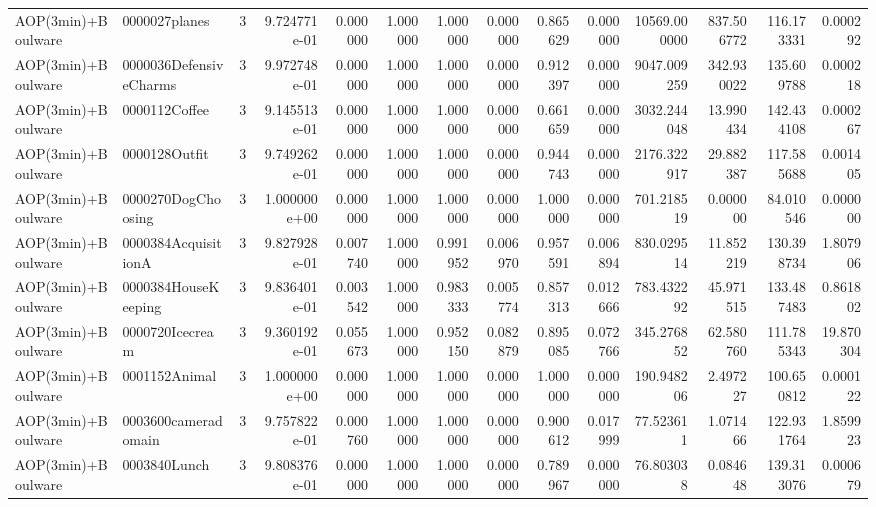 \begin{tabular}{llrr|r|rr|rr|rr|rrr}
       AOP(3min)+Boulware &          0000027planes &       3 & 9.724771e-01 & 0.000000 & 1.000000 &      1.000000 & 0.000000 &      0.865629 & 0.000000 &  10569.000000 &  837.506772 &   116.173331 &    0.000292 \\
       AOP(3min)+Boulware & 0000036DefensiveCharms &       3 & 9.972748e-01 & 0.000000 & 1.000000 &      1.000000 & 0.000000 &      0.912397 & 0.000000 &   9047.009259 &  342.930022 &   135.609788 &    0.000218 \\
       AOP(3min)+Boulware &          0000112Coffee &       3 & 9.145513e-01 & 0.000000 & 1.000000 &      1.000000 & 0.000000 &      0.661659 & 0.000000 &   3032.244048 &   13.990434 &   142.434108 &    0.000267 \\
       AOP(3min)+Boulware &          0000128Outfit &       3 & 9.749262e-01 & 0.000000 & 1.000000 &      1.000000 & 0.000000 &      0.944743 & 0.000000 &   2176.322917 &   29.882387 &   117.585688 &    0.001405 \\
       AOP(3min)+Boulware &     0000270DogChoosing &       3 & 1.000000e+00 & 0.000000 & 1.000000 &      1.000000 & 0.000000 &      1.000000 & 0.000000 &    701.218519 &    0.000000 &    84.010546 &    0.000000 \\
       AOP(3min)+Boulware &    0000384AcquisitionA &       3 & 9.827928e-01 & 0.007740 & 1.000000 &      0.991952 & 0.006970 &      0.957591 & 0.006894 &    830.029514 &   11.852219 &   130.398734 &    1.807906 \\
       AOP(3min)+Boulware &    0000384HouseKeeping &       3 & 9.836401e-01 & 0.003542 & 1.000000 &      0.983333 & 0.005774 &      0.857313 & 0.012666 &    783.432292 &   45.971515 &   133.487483 &    0.861802 \\
       AOP(3min)+Boulware &        0000720Icecream &       3 & 9.360192e-01 & 0.055673 & 1.000000 &      0.952150 & 0.082879 &      0.895085 & 0.072766 &    345.276852 &   62.580760 &   111.785343 &   19.870304 \\
       AOP(3min)+Boulware &          0001152Animal &       3 & 1.000000e+00 & 0.000000 & 1.000000 &      1.000000 & 0.000000 &      1.000000 & 0.000000 &    190.948206 &    2.497227 &   100.650812 &    0.000122 \\
       AOP(3min)+Boulware &    0003600cameradomain &       3 & 9.757822e-01 & 0.000760 & 1.000000 &      1.000000 & 0.000000 &      0.900612 & 0.017999 &     77.523611 &    1.071466 &   122.931764 &    1.859923 \\
       AOP(3min)+Boulware &           0003840Lunch &       3 & 9.808376e-01 & 0.000000 & 1.000000 &      1.000000 & 0.000000 &      0.789967 & 0.000000 &     76.803038 &    0.084648 &   139.313076 &    0.000679 \\

\end{tabular}
